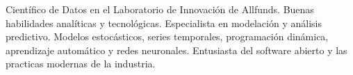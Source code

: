 

\begin{cvparagraph}

Científico de Datos en el Laboratorio de Innovación de Allfunds. Buenas habilidades
analíticas y tecnológicas. Especialista en modelación y análisis predictivo.
Modelos estocásticos, series temporales, programación dinámica, aprendizaje automático
y redes neuronales. Entusiasta del software abierto y las practicas modernas de
la industria.

\end{cvparagraph}

